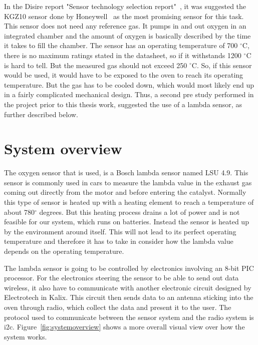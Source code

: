 In the Disire report "Sensor technology selection report"~\cite{DISIRE1}, it was suggested the KGZ10 sensor done by Honeywell~\cite{KGZ10} as the most promising sensor for this task. This sensor does not need any reference gas. It pumps in and out oxygen in an integrated chamber and the amount of oxygen is basically described by the time it takes to fill the chamber. The sensor has an operating temperature of 700 $^\circ$C, there is no maximum ratings stated in the datasheet, so if it withstands 1200 $^\circ$C is hard to tell. But the measured gas should not exceed 250 $^\circ$C. So, if this sensor would be used, it would have to be exposed to the oven to reach its operating temperature. But the gas has to be cooled down, which would most likely end up in a fairly complicated mechanical design. Thus, a second pre study performed in the project prior to this thesis work, suggested the use of a lambda sensor, as further described below.

\section{System overview}
\label{sec_-_}

The oxygen sensor that is used, is a Bosch lambda sensor named LSU 4.9. This sensor is commonly used in cars to measure the lambda value in the exhaust gas coming out directly from the motor and before entering the catalyst. Normally this type of sensor is heated up with a heating element to reach a temperature of about 780$^{\circ}$ degrees. But this heating process drains a lot of power and is not feasible for our system, which runs on batteries. Instead the sensor is heated up by the environment around itself. This will not lead to its perfect operating temperature and therefore it has to take in consider how the lambda value depends on the operating temperature.




The lambda sensor is going to be controlled by electronics involving an 8-bit PIC processor. For the electronics steering the sensor to be able to send out data wireless, it also have to communicate with another electronic circuit designed by Electrotech in Kalix. This circuit then sends data to an antenna sticking into the oven through radio, which collect the data and present it to the user. The protocol used to communicate between the sensor system and the radio system is \ac{i2c}. Figure~\ref{fig:systemoverview} shows a more overall visual view over how the system works.



